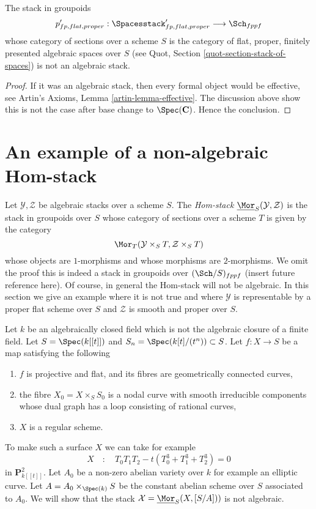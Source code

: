 \begin{lemma}
\label{lemma-proper-spaces-not-algebraic}
The stack in groupoids
$$
p'_{fp, flat, proper} :
\Spacesstack'_{fp, flat, proper}
\longrightarrow
\Sch_{fppf}
$$
whose category of sections over a scheme $S$ is the category of
flat, proper, finitely presented algebraic spaces over $S$
(see Quot, Section \ref{quot-section-stack-of-spaces})
is not an algebraic stack.
\end{lemma}

\begin{proof}
If it was an algebraic stack, then every formal object would be
effective, see Artin's Axioms, Lemma \ref{artin-lemma-effective}.
The discussion above show this is not the case
after base change to $\Spec(\mathbf{C})$.
Hence the conclusion.
\end{proof}






\section{An example of a non-algebraic Hom-stack}
\label{section-non-algebraic-hom-stack}

\noindent
Let $\mathcal{Y}, \mathcal{Z}$ be algebraic stacks over a scheme $S$.
The {\it Hom-stack} $\underline{\Mor}_S(\mathcal{Y}, \mathcal{Z})$
is the stack in groupoids over $S$ whose category of sections over
a scheme $T$ is given by the category
$$
\Mor_T(\mathcal{Y} \times_S T, \mathcal{Z} \times_S T)
$$
whose objects are $1$-morphisms and whose morphisms are $2$-morphisms.
We omit the proof this is indeed a stack in groupoids over
$(\Sch/S)_{fppf}$ (insert future reference here). Of course, in
general the Hom-stack will not be algebraic. In this section we
give an example where it is not true and where $\mathcal{Y}$ is
representable by a proper flat scheme over $S$ and $\mathcal{Z}$
is smooth and proper over $S$.

\medskip\noindent
Let $k$ be an algebraically closed field which is not the algebraic
closure of a finite field. Let $S = \Spec(k[[t]])$
and $S_n = \Spec(k[t]/(t^n)) \subset S$. Let $f : X \to S$ be a map
satisfying the following
\begin{enumerate}
\item $f$ is projective and flat, and its fibres are geometrically
connected curves,
\item the fibre $X_0 = X \times_S S_0$ is a nodal curve with smooth
irreducible components whose dual graph has a loop consisting of
rational curves,
\item $X$ is a regular scheme.
\end{enumerate}
To make such a surface $X$ we can take for example
$$
X\quad :\quad T_0T_1T_2 - t(T_0^3 + T_1^3 + T_2^3) = 0
$$
in $\mathbf{P}^2_{k[[t]]}$. Let $A_0$ be a non-zero abelian variety over $k$
for example an elliptic curve.  Let $A = A_0 \times_{\Spec(k)} S$ be the
constant abelian scheme over $S$ associated to $A_0$. We will show that the
stack $\mathcal{X} = \underline{\Mor}_S(X, [S/A]))$ is not algebraic.

